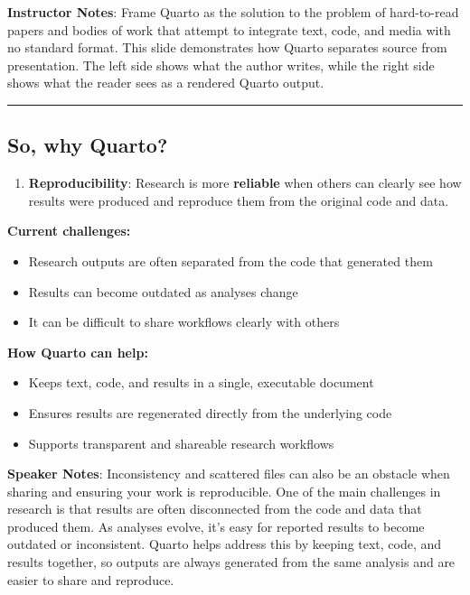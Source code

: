 \documentclass[
  letterpaper,
  DIV=11,
  numbers=noendperiod]{scrartcl}
\providecommand{\tightlist}{%
  \setlength{\itemsep}{0pt}\setlength{\parskip}{0pt}}
\begin{document}
\textbf{Instructor Notes}: Frame Quarto as the solution to the problem
of hard-to-read papers and bodies of work that attempt to integrate
text, code, and media with no standard format. This slide demonstrates
how Quarto separates source from presentation. The left side shows what
the author writes, while the right side shows what the reader sees as a
rendered Quarto output.

\begin{center}\rule{0.5\linewidth}{0.5pt}\end{center}

\subsection{So, why Quarto?}\label{so-why-quarto-1}

\begin{enumerate}
\def\labelenumi{\arabic{enumi}.}
\setcounter{enumi}{1}
\tightlist
\item
  \textbf{Reproducibility}: Research is more \textbf{reliable} when
  others can clearly see how results were produced and reproduce them
  from the original code and data.
\end{enumerate}

\textbf{Current challenges:}

\begin{itemize}
\tightlist
\item
  Research outputs are often separated from the code that generated
  them\\
\item
  Results can become outdated as analyses change\\
\item
  It can be difficult to share workflows clearly with others
\end{itemize}

\textbf{How Quarto can help:}

\begin{itemize}
\tightlist
\item
  Keeps text, code, and results in a single, executable document\\
\item
  Ensures results are regenerated directly from the underlying code\\
\item
  Supports transparent and shareable research workflows
\end{itemize}

\textbf{Speaker Notes}: Inconsistency and scattered files can also be an
obstacle when sharing and ensuring your work is reproducible. One of the
main challenges in research is that results are often disconnected from
the code and data that produced them. As analyses evolve, it's easy for
reported results to become outdated or inconsistent. Quarto helps
address this by keeping text, code, and results together, so outputs are
always generated from the same analysis and are easier to share and
reproduce.
\end{document}
